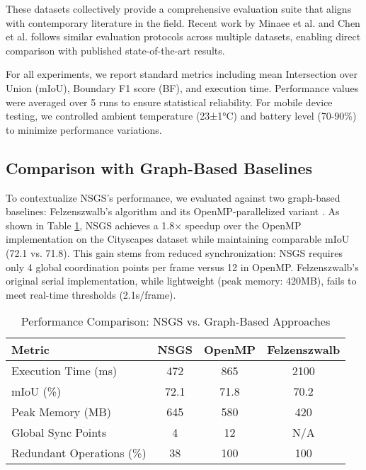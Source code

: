 \documentclass[conference]{IEEEtran}
\begin{document}
These datasets collectively provide a comprehensive evaluation suite that aligns with contemporary literature in the field. Recent work by Minaee et al. \cite{Minaee2021} and Chen et al. \cite{Chen2021} follows similar evaluation protocols across multiple datasets, enabling direct comparison with published state-of-the-art results.

For all experiments, we report standard metrics including mean Intersection over Union (mIoU), Boundary F1 score (BF), and execution time. Performance values were averaged over 5 runs to ensure statistical reliability. For mobile device testing, we controlled ambient temperature (23±1°C) and battery level (70-90\%) to minimize performance variations.

\subsection{Comparison with Graph-Based Baselines}
To contextualize NSGS's performance, we evaluated against two graph-based baselines: Felzenszwalb's algorithm \cite{Felzenszwalb2004} and its OpenMP-parallelized variant \cite{Saglam2016}. As shown in Table \ref{tab:graph-comparison}, NSGS achieves a 1.8× speedup over the OpenMP implementation on the Cityscapes dataset while maintaining comparable mIoU (72.1 vs. 71.8). This gain stems from reduced synchronization: NSGS requires only 4 global coordination points per frame versus 12 in OpenMP. Felzenszwalb's original serial implementation, while lightweight (peak memory: 420MB), fails to meet real-time thresholds (2.1s/frame).

\begin{table}[htbp]
\caption{Performance Comparison: NSGS vs. Graph-Based Approaches}
\label{tab:graph-comparison}
\centering
\begin{tabular}{|l|c|c|c|}
\hline
\textbf{Metric} & \textbf{NSGS} & \textbf{OpenMP \cite{Saglam2016}} & \textbf{Felzenszwalb \cite{Felzenszwalb2004}} \\
\hline
Execution Time (ms) & 472 & 865 & 2100 \\
\hline
mIoU (\%) & 72.1 & 71.8 & 70.2 \\
\hline
Peak Memory (MB) & 645 & 580 & 420 \\
\hline
Global Sync Points & 4 & 12 & N/A \\
\hline
Redundant Operations (\%) & 38 & 100 & 100 \\
\hline
\end{tabular}
\end{table}
\end{document}

